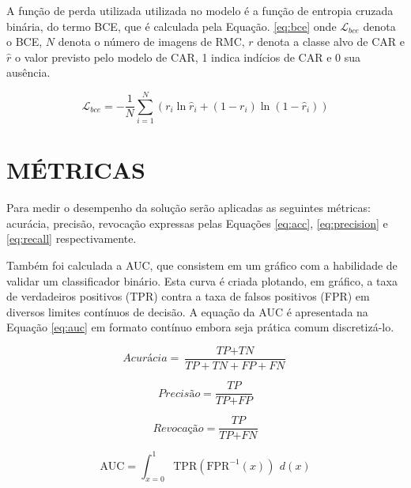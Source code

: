 A função de perda utilizada utilizada no modelo é a função de entropia cruzada binária, do termo  \gls{BCE}, que é calculada pela Equação. \ref{eq:bce} onde $\mathcal{L}_{bce}$ denota o \gls{BCE}, $N$ denota o número de imagens de \gls{RMC}, $r$ denota a classe alvo de \gls{CAR} e $\hat{r}$ o valor previsto pelo modelo de \gls{CAR}, 1 indica indícios de \gls{CAR} e 0 sua ausência.

\begin{equation}
\mathcal{L}_{bce} = -\frac{1}{N} \sum_{i=1}^N
(r_i \ln \hat{r}_i + (1 - r_i) \ln (1 - \hat{r}_i))
\label{eq:bce}
\end{equation}

\section{MÉTRICAS}
\label{subsec:cap4_metrics}
Para medir o desempenho da solução serão aplicadas as seguintes métricas: acurácia, precisão, revocação expressas pelas Equações \ref{eq:acc}, \ref{eq:precision} e \ref{eq:recall} respectivamente.

Também foi calculada a \gls{AUC}, que consistem em um gráfico com a habilidade de validar um classificador binário. Esta curva é criada plotando, em gráfico, a taxa de verdadeiros positivos (TPR) contra a taxa de falsos positivos (FPR) em diversos limites contínuos de decisão. A equação da \gls{AUC} é apresentada na Equação \ref{eq:auc} em formato contínuo embora seja prática comum discretizá-lo.


\begin{equation}
  \textit{Acurácia} = \frac{\textit{TP} + \textit{TN}}{\textit{TP} + \textit{TN} + \textit{FP} + \textit{FN}}
  \label{eq:acc}
\end{equation}

\begin{equation}
  \textit{Precisão} = \frac{\textit{TP}}{\textit{TP} + \textit{FP}}
  \label{eq:precision}
\end{equation}

\begin{equation}
  \textit{Revocação} = \frac{\textit{TP}}{\textit{TP} + \textit{FN}}
  \label{eq:recall}
\end{equation}

\begin{equation}
  \text{AUC} = \int_{x=0}^{1} \text{TPR}(\text{FPR}^{-1}(x)) \ \, d(x)
  \label{eq:auc}
\end{equation}

